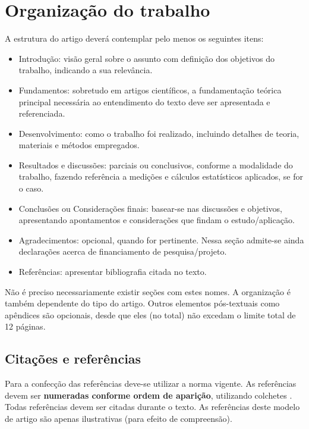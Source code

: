 \section{Organização do trabalho}

A estrutura do artigo deverá contemplar pelo menos os seguintes itens:
%
\begin{itemize}[noitemsep,topsep=0ex] \itemsep=3pt
	\item Introdução: visão geral sobre o assunto com definição dos objetivos do trabalho, indicando a sua relevância.
	\item Fundamentos: sobretudo em artigos científicos, a fundamentação teórica principal necessária ao entendimento do texto deve ser apresentada e referenciada. 
	\item Desenvolvimento: como o trabalho foi realizado, incluindo detalhes de teoria, materiais e métodos empregados.
	\item Resultados e discussões: parciais ou conclusivos, conforme a modalidade do trabalho, fazendo referência a medições e cálculos estatísticos aplicados, se for o caso.
	\item Conclusões ou Considerações finais: basear-se nas discussões e objetivos, apresentando apontamentos e considerações que findam o estudo/aplicação.
	\item Agradecimentos: opcional, quando for pertinente. Nessa seção admite-se ainda declarações acerca de financiamento de pesquisa/projeto.
	\item Referências: apresentar bibliografia citada no texto.
\end{itemize}
%
Não é preciso necessariamente existir seções com estes nomes. A organização é também dependente do tipo do artigo.
Outros elementos pós-textuais como apêndices são opcionais, desde que eles (no total) não excedam o limite total de 12 páginas. 

\subsection{Citações e referências}

Para a confecção das referências deve-se utilizar a norma vigente. As referências devem ser \textbf{numeradas conforme ordem de aparição}, utilizando colchetes \cite{Gomes-2015}. Todas referências devem ser citadas durante o texto. As referências \cite{Mareze-2017,Fonseca-2013,Brandao-2017,Gomes-2015,Oppenheim-2010,Muller-2001,Mareze-2019,aev:piccini2020} deste modelo de artigo são apenas ilustrativas (para efeito de compreensão).

